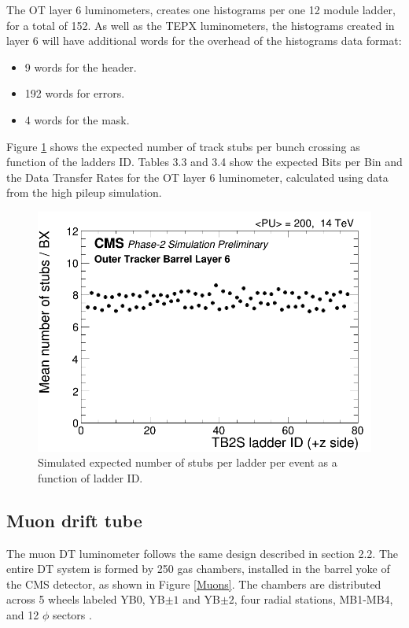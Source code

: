 The OT layer 6 luminometers, creates one histograms per one 12 module ladder, for a total of 152. As well as the TEPX luminometers, the histograms created in layer 6 will have additional words for the overhead of the histograms data format:
\begin{itemize}
    \item 9 words for the header.
    \item  192 words for errors.
    \item 4 words for the mask.
\end{itemize}

Figure \ref{otstubs} shows the expected number of track stubs per bunch crossing as function of the ladders ID. Tables 3.3
and 3.4 show the expected Bits per Bin and the Data Transfer Rates for the OT layer 6 luminometer, calculated using data from the high pileup simulation.
\begin{center}
\begin{figure}[H]
    \centering
    \includegraphics[scale=.4]{Chapter3/OT-Rates.png}
    \caption[Simulated expected number of stubs per ladder per event.]{Simulated expected number of stubs per ladder per event as a function of ladder ID.}
    \label{otstubs}
\end{figure}
\end{center}
\subsection*{Muon drift tube}
The muon DT luminometer follows the same design described in section 2.2. The entire DT system is formed by 250 gas chambers, installed in the barrel yoke of the CMS detector, as shown in Figure \ref{Muons}. The chambers are distributed across 5 wheels labeled YB0, YB$\pm1$ and YB$\pm2$, four radial stations, MB1-MB4, and 12 $\phi$ sectors \cite{ABBIENDI2009192}.

